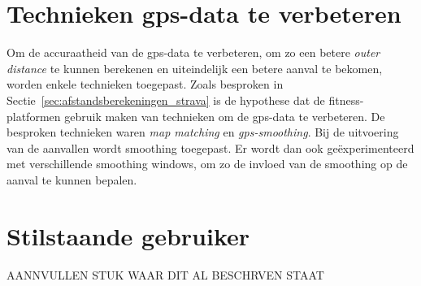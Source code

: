 \section{Technieken gps-data te verbeteren}
Om de accuraatheid van de \ac{gps}-data te verbeteren, om zo een betere
\textit{outer distance} te kunnen berekenen en uiteindelijk een betere aanval
te bekomen, worden enkele technieken toegepast. Zoals besproken in
Sectie~\ref{sec:afstandsberekeningen_strava} is de hypothese dat de
fitness-platformen gebruik maken van technieken om de \ac{gps}-data te
verbeteren. De besproken technieken waren \textit{map matching} en
\textit{\ac{gps}-smoothing}. Bij de uitvoering van de aanvallen wordt smoothing
toegepast. Er wordt dan ook geëxperimenteerd met verschillende smoothing
windows, om zo de invloed van de smoothing op de aanval te kunnen bepalen.

\section{Stilstaande gebruiker}
AANNVULLEN STUK WAAR DIT AL BESCHRVEN STAAT
